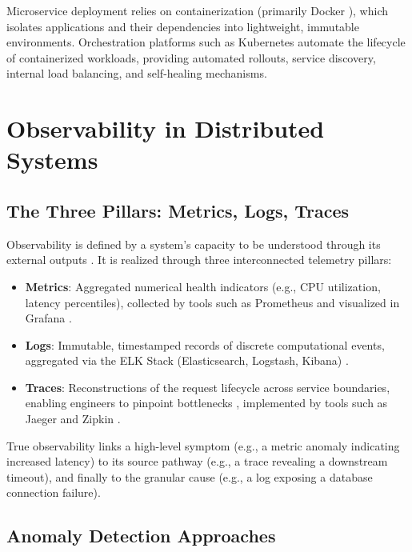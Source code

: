 Microservice deployment relies on containerization (primarily Docker
\cite{merkel2014docker}), which isolates applications and their dependencies into
lightweight, immutable environments. Orchestration platforms such as Kubernetes
\cite{burns2016borg} automate the lifecycle of containerized workloads, providing
automated rollouts, service discovery, internal load balancing, and self-healing
mechanisms.

\section{Observability in Distributed Systems}
\label{sec:bg_observability}

\subsection{The Three Pillars: Metrics, Logs, Traces}
\label{subsec:bg_pillars}

Observability is defined by a system's capacity to be understood through its external
outputs \cite{kalloniatis2020microservices_observability}. It is realized through three
interconnected telemetry pillars:

\begin{itemize}
    \item \textbf{Metrics}: Aggregated numerical health indicators (e.g., CPU
    utilization, latency percentiles), collected by tools such as Prometheus
    \cite{prometheus2016} and visualized in Grafana \cite{grafana2015}.

    \item \textbf{Logs}: Immutable, timestamped records of discrete computational
    events, aggregated via the ELK Stack (Elasticsearch, Logstash, Kibana)
    \cite{elk2013}.

    \item \textbf{Traces}: Reconstructions of the request lifecycle across service
    boundaries, enabling engineers to pinpoint bottlenecks \cite{sigelman2010dapper},
    implemented by tools such as Jaeger \cite{jaeger2017} and Zipkin \cite{zipkin2012}.
\end{itemize}

True observability links a high-level symptom (e.g., a metric anomaly indicating
increased latency) to its source pathway (e.g., a trace revealing a downstream
timeout), and finally to the granular cause (e.g., a log exposing a database
connection failure).

\subsection{Anomaly Detection Approaches}
\label{subsec:bg_anomaly_overview}

